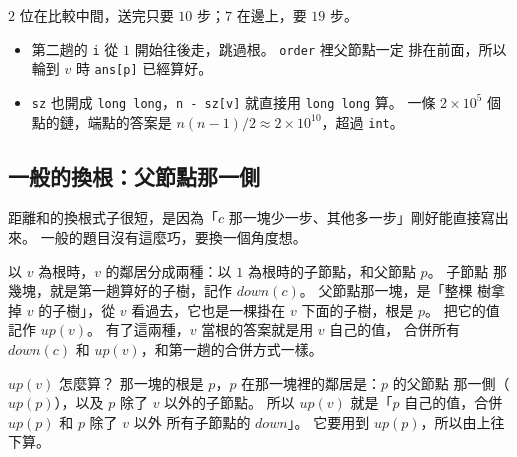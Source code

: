 $2$ 位在比較中間，送完只要 $10$ 步；$7$ 在邊上，要 $19$ 步。

\begin{itemize}
\item 第二趟的 \texttt{i} 從 $1$ 開始往後走，跳過根。 \texttt{order} 裡父節點一定
排在前面，所以輪到 $v$ 時 \texttt{ans[p]} 已經算好。
\item \texttt{sz} 也開成 \texttt{long long}，\texttt{n - sz[v]} 就直接用
\texttt{long long} 算。 一條 $2 \times 10^5$ 個點的鏈，端點的答案是
$n(n-1)/2 \approx 2 \times 10^{10}$，超過 \texttt{int}。
\end{itemize}

\subsection{一般的換根：父節點那一側}

距離和的換根式子很短，是因為「$c$ 那一塊少一步、其他多一步」剛好能直接寫出來。
一般的題目沒有這麼巧，要換一個角度想。

以 $v$ 為根時，$v$ 的鄰居分成兩種：以 $1$ 為根時的子節點，和父節點 $p$。 子節點
那幾塊，就是第一趟算好的子樹，記作 $\mathit{down}(c)$。 父節點那一塊，是「整棵
樹拿掉 $v$ 的子樹」，從 $v$ 看過去，它也是一棵掛在 $v$ 下面的子樹，根是 $p$。
把它的值記作 $\mathit{up}(v)$。 有了這兩種，$v$ 當根的答案就是用 $v$ 自己的值，
合併所有 $\mathit{down}(c)$ 和 $\mathit{up}(v)$，和第一趟的合併方式一樣。

\begin{center}
\label{fig:tdp-up}
\end{center}

$\mathit{up}(v)$ 怎麼算？ 那一塊的根是 $p$，$p$ 在那一塊裡的鄰居是：$p$ 的父節點
那一側（$\mathit{up}(p)$），以及 $p$ 除了 $v$ 以外的子節點。 所以
$\mathit{up}(v)$ 就是「$p$ 自己的值，合併 $\mathit{up}(p)$ 和 $p$ 除了 $v$ 以外
所有子節點的 $\mathit{down}$」。 它要用到 $\mathit{up}(p)$，所以由上往下算。

